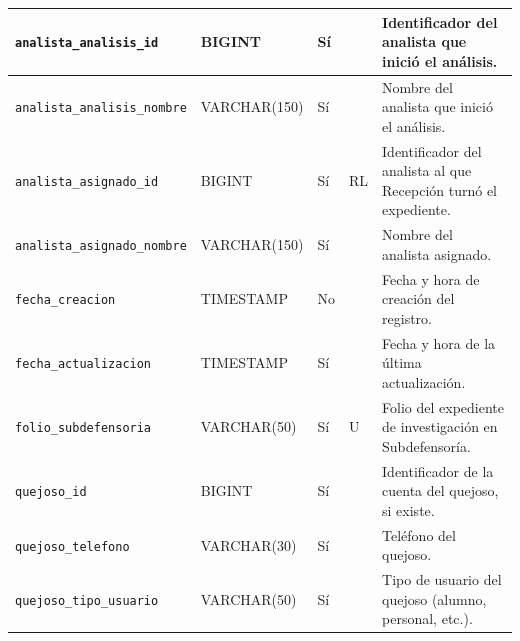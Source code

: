 \begin{longtable}{|L{3.9cm}|L{2.4cm}|L{0.9cm}|L{1.2cm}|L{6.6cm}|}
		\texttt{analista\_\allowbreak{}analisis\_\allowbreak{}id} & BIGINT & Sí &  & Identificador del analista que inició el análisis. \\ \hline
		\texttt{analista\_\allowbreak{}analisis\_\allowbreak{}nombre} & VARCHAR(150) & Sí &  & Nombre del analista que inició el análisis. \\ \hline
		\texttt{analista\_\allowbreak{}asignado\_\allowbreak{}id} & BIGINT & Sí & RL & Identificador del analista al que Recepción turnó el expediente. \\ \hline
		\texttt{analista\_\allowbreak{}asignado\_\allowbreak{}nombre} & VARCHAR(150) & Sí &  & Nombre del analista asignado. \\ \hline
		\texttt{fecha\_\allowbreak{}creacion} & TIMESTAMP & No &  & Fecha y hora de creación del registro. \\ \hline
		\texttt{fecha\_\allowbreak{}actualizacion} & TIMESTAMP & Sí &  & Fecha y hora de la última actualización. \\ \hline
		\texttt{folio\_\allowbreak{}subdefensoria} & VARCHAR(50) & Sí & U & Folio del expediente de investigación en Subdefensoría. \\ \hline
		\texttt{quejoso\_\allowbreak{}id} & BIGINT & Sí &  & Identificador de la cuenta del quejoso, si existe. \\ \hline
		\texttt{quejoso\_\allowbreak{}telefono} & VARCHAR(30) & Sí &  & Teléfono del quejoso. \\ \hline
		\texttt{quejoso\_\allowbreak{}tipo\_\allowbreak{}usuario} & VARCHAR(50) & Sí &  & Tipo de usuario del quejoso (alumno, personal, etc.). \\ \hline
\end{longtable}
\normalsize
\setlength{\tabcolsep}{6pt}
\renewcommand{\arraystretch}{1}

